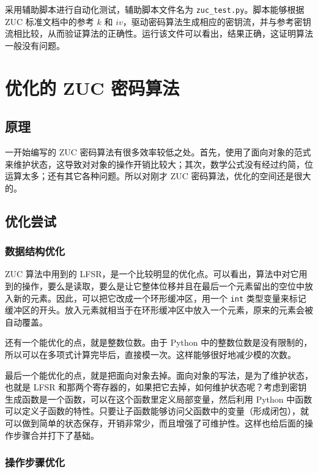 \documentclass[a4paper, 10pt]{article}
\begin{document}
采用辅助脚本进行自动化测试，辅助脚本文件名为 \verb|zuc_test.py|。脚本能够根据 ZUC 标准文档中的参考 $ k $ 和 $ iv $，驱动密码算法生成相应的密钥流，并与参考密钥流相比较，从而验证算法的正确性。运行该文件可以看出，结果正确，这证明算法一般没有问题。

\section*{优化的 ZUC 密码算法}

\subsection*{原理}

一开始编写的 ZUC 密码算法有很多效率较低之处。首先，使用了面向对象的范式来维护状态，这导致对对象的操作开销比较大；其次，数学公式没有经过约简，位运算太多；还有其它各种问题。所以对刚才 ZUC 密码算法，优化的空间还是很大的。

\subsection*{优化尝试}

\subsubsection*{数据结构优化}

ZUC 算法中用到的 LFSR，是一个比较明显的优化点。可以看出，算法中对它用到的操作，要么是读取，要么是让它整体位移并且在最后一个元素留出的空位中放入新的元素。因此，可以把它改成一个环形缓冲区，用一个 \verb|int| 类型变量来标记缓冲区的开头。放入元素就相当于在环形缓冲区中放入一个元素，原来的元素会被自动覆盖。

还有一个能优化的点，就是整数位数。由于 Python 中的整数位数是没有限制的，所以可以在多项式计算完毕后，直接模一次。这样能够很好地减少模的次数。

最后一个能优化的点，就是把面向对象去掉。面向对象的写法，是为了维护状态，也就是 LFSR 和那两个寄存器的，如果把它去掉，如何维护状态呢？考虑到密钥生成函数是一个函数，可以在这个函数里定义局部变量，然后利用 Python 中函数可以定义子函数的特性。只要让子函数能够访问父函数中的变量（形成闭包），就可以做到简单的状态保存，开销非常少，而且增强了可维护性。这样也给后面的操作步骤合并打下了基础。

\subsubsection*{操作步骤优化}
\end{document}
